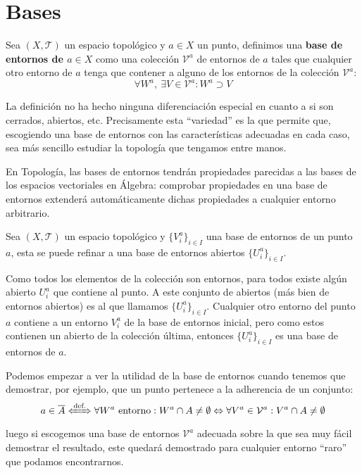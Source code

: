 \section{Bases}%
\label{sec:bases}
\begin{defi}
Sea $(X, \mathcal{T})$ un espacio topológico y $a\in X$ un punto, definimos una \textbf{base de entornos de $a \in X$} como una colección $\mathcal{V}^a$ de entornos de $a$ tales que cualquier otro entorno de $a$ tenga que contener a alguno de los entornos de la colección $\mathcal{V}^a$:
\[
\forall W^a,\ \exists V \in \mathcal{V}^a : W^a \supset V 
\]
\end{defi}

\begin{obs}
La definición no ha hecho ninguna diferenciación especial en cuanto a si son cerrados, abiertos, etc. Precisamente esta ``variedad'' es la que permite que, escogiendo una base de entornos con las características adecuadas en cada caso, sea más sencillo estudiar la topología que tengamos entre manos.

En Topología, las bases de entornos tendrán propiedades parecidas a las bases de los espacios vectoriales en Álgebra: comprobar propiedades en una base de entornos extenderá automáticamente dichas propiedades a cualquier entorno arbitrario.
\end{obs}

\begin{prop}
Sea $(X,\mathcal{T})$ un espacio topológico y $\{V_i^a \}_{i\in I}$ una base de entornos de un punto $a$, esta se puede refinar a una base de entornos abiertos $\{U_i^a\}_{i\in I}$. 
\end{prop}
\begin{demo}    
Como todos los elementos de la colección son entornos, para todos existe algún abierto $U_i^a$ que contiene al punto. A este conjunto de abiertos (más bien de entornos abiertos) es al que llamamos $\{U_i^a\}_{i\in I}$. Cualquier otro entorno del punto $a$ contiene a un entorno $V_i^a$ de la base de entornos inicial, pero como estos contienen un abierto de la colección última, entonces $\{U_i^a\}_{i\in I}$ es una base de entornos de  $a$.
\end{demo}

\begin{obs}    
Podemos empezar a ver la utilidad de la base de entornos cuando tenemos que demostrar, por ejemplo, que un punto pertenece a la adherencia de un conjunto:
$$
a \in \overline{A} \xLeftrightarrow{\text{def.}} \forall W^a \text{ entorno}: W^a \cap A \neq \emptyset \Leftrightarrow \forall V^a \in \mathcal{V}^a: V^a\cap A \neq \emptyset
$$
luego si escogemos una base de entornos $\mathcal{V}^a$ adecuada sobre la que sea muy fácil demostrar el resultado, este quedará demostrado para cualquier entorno ``raro'' que podamos encontrarnos.
\end{obs}

